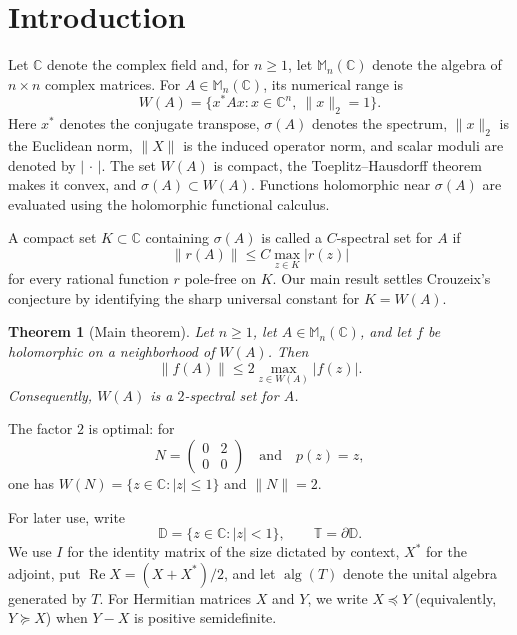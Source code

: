 \documentclass[preprints,article,submit,oneauthor]{Definitions/mdpi}
\newcounter{manuscriptresult}[section]
\theoremstyle{mdpi}
\newtheorem{theorem}[manuscriptresult]{Theorem}
\theoremstyle{definition}
\newcommand{\C}{\mathbb C}
\newcommand{\D}{\mathbb D}
\newcommand{\Torus}{\mathbb T}
\newcommand{\Mn}{\mathbb M_n(\C)}
\newcommand{\alg}{\operatorname{alg}}
\newcommand{\RePart}{\operatorname{Re}}
\begin{document}
\section{Introduction}
\label{sec:introduction}

Let $\C$ denote the complex field and, for $n\geq1$, let $\Mn$ denote
the algebra of $n\times n$ complex matrices.  For $A\in\Mn$, its
numerical range is
\begin{equation}
  W(A)=\{x^*Ax:x\in\C^n,\ \lVert x\rVert_2=1\}.
  \label{eq:numerical-range}
\end{equation}
Here $x^*$ denotes the conjugate transpose, $\sigma(A)$ denotes the
spectrum, $\lVert x\rVert_2$ is the Euclidean norm, $\lVert X\rVert$ is
the induced operator norm, and scalar moduli are denoted by
$\lvert\,\cdot\,\rvert$.  The set $W(A)$ is compact, the
Toeplitz--Hausdorff theorem makes it convex, and
$\sigma(A)\subset W(A)$.  Functions holomorphic near $\sigma(A)$ are
evaluated using the holomorphic functional calculus.

A compact set $K\subset\C$ containing $\sigma(A)$ is called a
$C$-spectral set for $A$ if
\begin{equation}
  \lVert r(A)\rVert\leq C\max_{z\in K}\lvert r(z)\rvert
  \label{eq:spectral-set-definition}
\end{equation}
for every rational function $r$ pole-free on $K$.  Our main result
settles Crouzeix's conjecture by identifying the sharp universal
constant for $K=W(A)$.

\begin{theorem}[Main theorem]
\label{thm:main}
Let $n\geq1$, let $A\in\Mn$, and let $f$ be holomorphic on a
neighborhood of $W(A)$.  Then
\begin{equation}
  \lVert f(A)\rVert
  \leq2\max_{z\in W(A)}\lvert f(z)\rvert.
  \label{eq:main-bound}
\end{equation}
Consequently, $W(A)$ is a $2$-spectral set for $A$.
\end{theorem}

The factor $2$ is optimal: for
\begin{equation}
  N=\begin{pmatrix}0&2\\0&0\end{pmatrix}
  \quad\text{and}\quad p(z)=z,
  \label{eq:sharp-example}
\end{equation}
one has $W(N)=\{z\in\C:\lvert z\rvert\leq1\}$ and
$\lVert N\rVert=2$.

For later use, write
\[
  \D=\{z\in\C:\lvert z\rvert<1\},
  \qquad
  \Torus=\partial\D.
\]
We use $I$ for the identity matrix of the size dictated by context,
$X^*$ for the adjoint, put $\RePart X=(X+X^*)/2$, and let $\alg(T)$
denote the unital algebra generated by $T$.  For Hermitian matrices
$X$ and $Y$, we write $X\preceq Y$ (equivalently, $Y\succeq X$) when
$Y-X$ is positive semidefinite.
\end{document}
